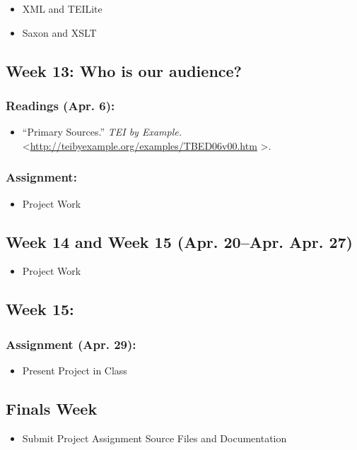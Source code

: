\documentclass[]{article}
\begin{document}
\begin{itemize}
\itemsep1pt\parskip0pt
\item
  XML and TEILite
\item
  Saxon and XSLT
\end{itemize}

\subsection{Week 13: Who is our
audience?}\label{week-13-who-is-our-audience}

\subsubsection{Readings (Apr. 6):}\label{readings-apr.-6}

\begin{itemize}
\itemsep1pt\parskip0pt
\item
  ``Primary Sources.'' \emph{TEI by Example.}
  \textless{}\url{http://teibyexample.org/examples/TBED06v00.htm}
  \textgreater{}.
\end{itemize}

\subsubsection{Assignment:}\label{assignment-7}

\begin{itemize}
\itemsep1pt\parskip0pt
\item
  Project Work
\end{itemize}

\subsection{Week 14 and Week 15 (Apr. 20--Apr. Apr.
27)}\label{week-14-and-week-15-apr.-20apr.-apr.-27}

\begin{itemize}
\itemsep1pt\parskip0pt
\item
  Project Work
\end{itemize}

\subsection{Week 15:}\label{week-15}

\subsubsection{Assignment (Apr. 29):}\label{assignment-apr.-29}

\begin{itemize}
\itemsep1pt\parskip0pt
\item
  Present Project in Class
\end{itemize}

\subsection{Finals Week}\label{finals-week}

\begin{itemize}
\itemsep1pt\parskip0pt
\item
  Submit Project Assignment Source Files and Documentation
\end{itemize}
\end{document}
